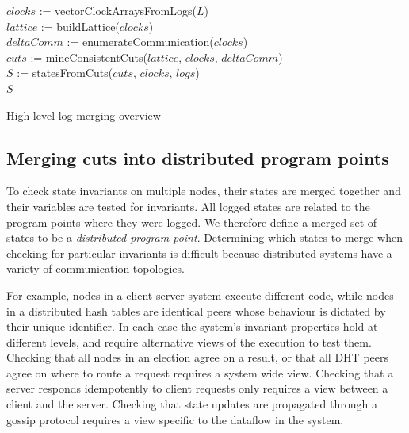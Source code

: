 
\begin{algorithm}[t]
        $clocks$ := vectorClockArraysFromLogs($L$)\\
        $lattice$ := buildLattice($clocks$)\\
        $deltaComm$ := enumerateCommunication($clocks$)\\
        $cuts$ := mineConsistentCuts($lattice$, $clocks$, $deltaComm$)\\
        $S$ := statesFromCuts($cuts$, $clocks$, $logs$)\\
    \Return $S$
    \label{alg:mineStates}
    \vspace{2mm}
    \caption{High level log merging overview}
\end{algorithm}


\subsection{Merging cuts into distributed program points}
\label{sec:merging}


%

To check state invariants on multiple nodes, their states are merged
together and their variables are tested for invariants. All logged
states are related to the program points where they were logged.  We
therefore define a merged set of states to be a \emph{distributed
  program point}. Determining which states to merge when checking for
particular invariants is difficult because distributed systems have a
variety of communication topologies. 

For example, nodes in a client-server system execute different code,
while nodes in a distributed hash tables are identical peers whose
behaviour is dictated by their unique identifier. In each case the
system's invariant properties hold at different levels, and require
alternative views of the execution to test them. Checking that all
nodes in an election agree on a result, or that all DHT peers agree on
where to route a request requires a system wide view.  Checking that a
server responds idempotently to client requests only requires a view
between a client and the server. Checking that state updates are
propagated through a gossip protocol requires a view specific to the
dataflow in the system.

